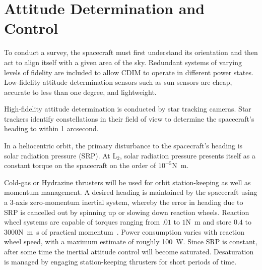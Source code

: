 \documentclass{ws-jai}
\begin{document}



\section{Attitude Determination and Control}
\label{sec:adcs}
To conduct a survey, the spacecraft must first understand its orientation and then act to align itself with a given area of the sky.
Redundant systems of varying levels of fidelity are included to allow CDIM to operate in different power states.
Low-fidelity attitude determination sensors such as sun sensors are cheap, accurate to less than one degree, and lightweight.

High-fidelity attitude determination is conducted by star tracking cameras.
Star trackers identify constellations in their field of view to determine the spacecraft's heading to within 1 arcsecond.


In a heliocentric orbit, the primary disturbance to the spacecraft's heading is solar radiation pressure (SRP).
At L$_2$, solar radiation pressure presents itself as a constant torque on the spacecraft on the order of $10^{-5}$\si{\newton\meter}.

Cold-gas or Hydrazine thrusters will be used for orbit station-keeping as well as momentum management.
A desired heading is maintained by the spacecraft using a 3-axis zero-momentum inertial system, whereby the error in heading due to SRP is cancelled out by spinning up or slowing down reaction wheels.
Reaction wheel systems are capable of torques ranging from $.01$ to $1$\si{\newton\meter} and store $0.4$ to $3000$\si{\newton\meter\second} of practical momentum~\cite{smad2015}.
Power consumption varies with reaction wheel speed, with a maximum estimate of roughly \SI{100}{\watt}.
Since SRP is constant, after some time the inertial attitude control will become saturated.
Desaturation is managed by engaging station-keeping thrusters for short periods of time.
\end{document}
